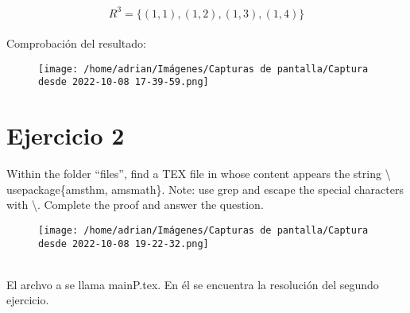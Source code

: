 \documentclass[11pt]{article}
\begin{document}
\begin{equation}
	R^3 = \{(1,1),(1,2),(1,3),(1,4)\} 
\end{equation}
\\
Comprobación del resultado:
\\
\begin{figure}[htp]
\centering
\texttt{[image: /home/adrian/Imágenes/Capturas de pantalla/Captura desde 2022-10-08 17-39-59.png]}
\label{}
\end{figure}
\newpage
\section*{Ejercicio 2}
Within the folder “files”, find a TEX file in whose content appears the string \textbackslash
usepackage\{amsthm, amsmath\}. Note: use grep and escape the special
characters with \textbackslash. Complete the proof and answer the question.
\begin{figure}[htp]
\centering
\texttt{[image: /home/adrian/Imágenes/Capturas de pantalla/Captura desde 2022-10-08 19-22-32.png]}
\label{}
\end{figure}
\\
El archvo a se llama mainP.tex. En él se encuentra la resolución del segundo ejercicio.
\end{document}

